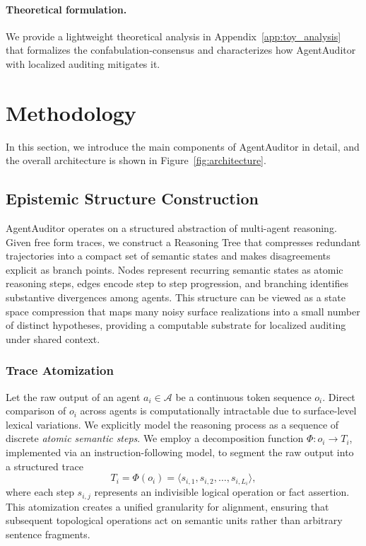 \documentclass{article}
\theoremstyle{plain}
\theoremstyle{definition}
\theoremstyle{remark}
\begin{document}
\paragraph{Theoretical formulation.}
We provide a lightweight theoretical analysis in Appendix~\ref{app:toy_analysis} that formalizes the confabulation-consensus and characterizes how AgentAuditor with localized auditing mitigates it.


\section{Methodology}
\label{sec:methodology}
In this section, we introduce the main components of AgentAuditor in detail, and the overall architecture is shown in Figure~\ref{fig:architecture}.



\subsection{Epistemic Structure Construction}
\label{sec:structure}

AgentAuditor operates on a structured abstraction of multi-agent reasoning. Given free form traces, we construct a Reasoning Tree that compresses redundant trajectories into a compact set of semantic states and makes disagreements explicit as branch points.
Nodes represent recurring semantic states as atomic reasoning steps, edges encode step to step progression, and branching identifies substantive divergences among agents. This structure can be viewed as a state space compression that maps many noisy surface realizations into a small number of distinct hypotheses, providing a computable substrate for localized auditing under shared context.


\subsubsection{Trace Atomization}
\label{sec:atomization}
Let the raw output of an agent $a_i \in \mathcal{A}$ be a continuous token sequence $o_i$. Direct comparison of $o_i$ across agents is computationally intractable due to surface-level lexical variations. We explicitly model the reasoning process as a sequence of discrete \textit{atomic semantic steps}.
We employ a decomposition function $\Phi: o_i \to T_i$, implemented via an instruction-following model, to segment the raw output into a structured trace
\begin{equation}
    T_i = \Phi(o_i) = \langle s_{i,1}, s_{i,2}, \dots, s_{i,L_i} \rangle,
\end{equation}
where each step $s_{i,j}$ represents an indivisible logical operation or fact assertion. This atomization creates a unified granularity for alignment, ensuring that subsequent topological operations act on semantic units rather than arbitrary sentence fragments.
\end{document}
